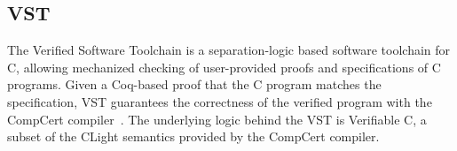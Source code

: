 \subsection{VST}
The Verified Software Toolchain is a separation-logic based software toolchain for C, allowing mechanized checking of user-provided proofs and specifications of C programs. Given a Coq-based proof that the C program matches the specification, VST guarantees the correctness of the verified program with the CompCert compiler~\cite{leroy:compcert}. The underlying logic behind the VST is Verifiable C, a subset of the CLight semantics provided by the CompCert compiler.

